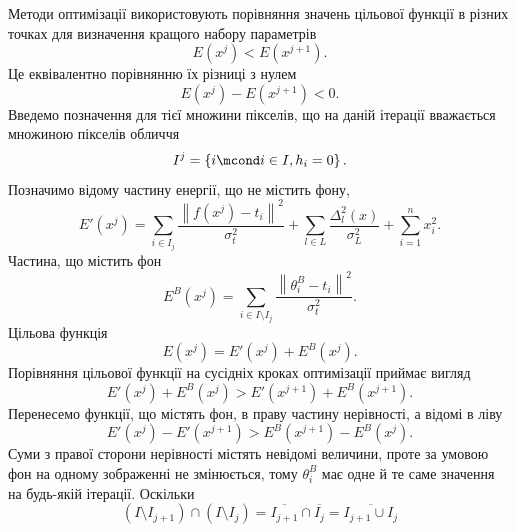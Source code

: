 Методи оптимізації використовують порівняння
значень цільової функції в різних точках
для визначення кращого набору параметрів
\begin{equation*}
  E\left( x^j \right) < E\left( x^{j+1} \right).
\end{equation*}
Це еквівалентно порівнянню їх різниці з нулем
\begin{equation*}
  E\left( x^j \right) - E\left( x^{j+1} \right) < 0.
\end{equation*}
Введемо позначення для тієї множини пікселів,
що на даній ітерації вважається множиною пікселів обличчя
\begin{equation*}
  I^j = \left\{ i \mcond i \in I, h_i = 0 \right\}.
\end{equation*}
Позначимо відому частину енергії, що не містить фону,
\begin{equation*}
  E'\left( x^j \right)
  = \sum_{i \in I_j} \frac{\left\| f\left( x^j \right) - t_i \right\|^2}{\sigma^2_t}
    + \sum_{l \in L} \frac{\Delta_l^2\left( x \right)}{\sigma_L^2}
    + \sum_{i = 1}^n x_i^2.
\end{equation*}
Частина, що містить фон
\begin{equation*}
  E^B\left( x^j \right)
  = \sum_{i \in I \setminus I_j} \frac{\left\| \theta_i^B - t_i \right\|^2}{\sigma^2_t}.
\end{equation*}
Цільова функція
\begin{equation*}
  E\left( x^j \right) = E'\left( x^j \right) + E^B\left( x^j \right).
\end{equation*}
Порівняння цільової функції на сусідніх кроках оптимізації приймає вигляд
\begin{equation*}
  E'\left( x^j \right) + E^B\left( x^j \right)
  > E'\left( x^{j+1} \right) + E^B\left( x^{j+1} \right).
\end{equation*}
Перенесемо функції, що містять фон, в праву частину нерівності,
а відомі в ліву
\begin{equation}\label{eq:energy:comparison}
  E'\left( x^j \right) - E'\left( x^{j+1} \right)
  > E^B\left( x^{j+1} \right) - E^B\left( x^j \right).
\end{equation}
Суми з правої сторони нерівності містять невідомі величини,
проте за умовою фон на одному зображенні не змінюється,
тому $\theta^B_i$ має одне й те саме значення на будь-якій ітерації.
Оскільки
\begin{equation*}
  \left( I \setminus I_{j+1} \right) \cap \left( I \setminus I_j \right)
  = \overline{I_{j+1}} \cap \overline{I_j}
  = \overline{I_{j+1} \cup I_j}
\end{equation*}
